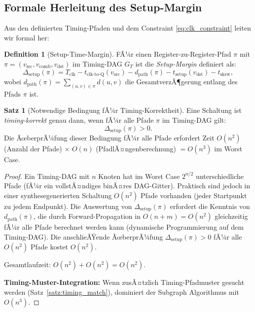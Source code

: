 ﻿\documentclass[a4paper,12pt]{article}
\theoremstyle{definition}
\newtheorem{definition}{Definition}
\newtheorem{satz}{Satz}
\begin{document}
\subsection{Formale Herleitung des Setup-Margin}

Aus den definierten Timing-Pfaden und dem Constraint \eqref{eq:clk_constraint} leiten
wir formal her:

\begin{definition}[Setup-Time-Margin]\label{def:setup_margin}
  FÃ¼r einen Register-zu-Register-Pfad $\pi$ mit $\pi = (v_{\text{src}}, v_{\text{comb}},
  v_{\text{dst}})$ im Timing-DAG $G_T$ ist die \emph{Setup-Margin} definiert als:
  \[
    \Delta_{\text{setup}}(\pi) = T_{\text{clk}} - t_{\text{clk-to-Q}}(v_{\text{src}})
    - d_{\text{path}}(\pi) - t_{\text{setup}}(v_{\text{dst}}) - t_{\text{skew}},
  \]
  wobei $d_{\text{path}}(\pi) = \sum_{(u,v) \in \pi} d(u,v)$ die GesamtverzÃ¶gerung
  entlang des Pfads $\pi$ ist.
\end{definition}

\begin{satz}[Notwendige Bedingung fÃ¼r Timing-Korrektheit]\label{satz:timing_correct}
  Eine Schaltung ist \emph{timing-korrekt} genau dann, wenn fÃ¼r alle Pfade
  $\pi$ im Timing-DAG gilt:
  \[
    \Delta_{\text{setup}}(\pi) > 0.
  \]
  Die ÃœberprÃ¼fung dieser Bedingung fÃ¼r alle Pfade erfordert Zeit $O(n^2)$ (Anzahl der
  Pfade) $\times$ $O(n)$ (PfadlÃ¤ngenberechnung) $= O(n^3)$ im Worst Case.
\end{satz}

\begin{proof}
  Ein Timing-DAG mit $n$ Knoten hat im Worst Case $2^{n/2}$ unterschiedliche Pfade
  (fÃ¼r ein vollstÃ¤ndiges binÃ¤res DAG-Gitter). Praktisch sind jedoch in einer
  synthesegenerierten Schaltung $O(n^2)$ Pfade vorhanden (jeder Startpunkt zu jedem
  Endpunkt). Die Auswertung von $\Delta_{\text{setup}}(\pi)$ erfordert die Kenntnis
  von $d_{\text{path}}(\pi)$, die durch Forward-Propagation in $O(n + m) = O(n^2)$
  gleichzeitig fÃ¼r alle Pfade berechnet werden kann (dynamische Programmierung auf
  dem Timing-DAG). Die anschlieÃŸende ÃœberprÃ¼fung $\Delta_{\text{setup}}(\pi) > 0$ fÃ¼r
  alle $O(n^2)$ Pfade kostet $O(n^2)$.

  Gesamtlaufzeit: $O(n^2) + O(n^2) = O(n^2)$.

  \textbf{Timing-Muster-Integration:} Wenn zusÃ¤tzlich Timing-Pfadmuster gesucht werden
  (Satz~\ref{satz:timing_match}), dominiert der Subgraph Algorithmus mit $O(n^3)$.
\end{proof}
\end{document}
